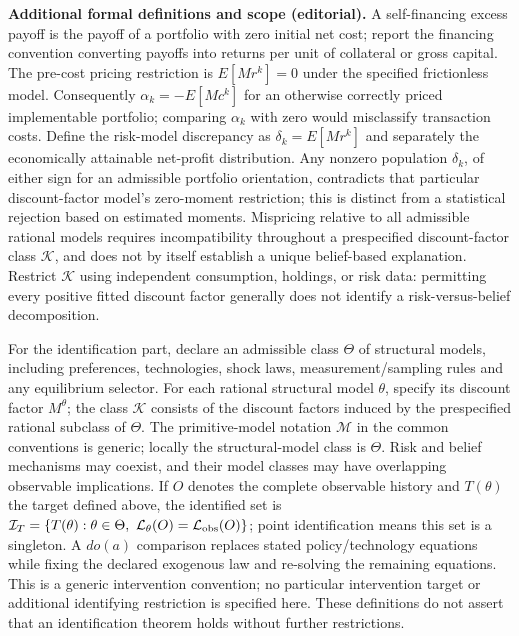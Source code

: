 \documentclass[11pt,a4paper]{article}
\begin{document}
\textbf{Additional formal definitions and scope (editorial).} A self-financing excess payoff is the payoff of a portfolio with zero initial net cost; report the financing convention converting payoffs into returns per unit of collateral or gross capital. The pre-cost pricing restriction is \(E[M r^k]=0\) under the specified frictionless model. Consequently \(\alpha_k=-E[M c^k]\) for an otherwise correctly priced implementable portfolio; comparing \(\alpha_k\) with zero would misclassify transaction costs. Define the risk-model discrepancy as \(\delta_k=E[M r^k]\) and separately the economically attainable net-profit distribution. Any nonzero population \(\delta_k\), of either sign for an admissible portfolio orientation, contradicts that particular discount-factor model's zero-moment restriction; this is distinct from a statistical rejection based on estimated moments. Mispricing relative to all admissible rational models requires incompatibility throughout a prespecified discount-factor class \(\mathcal K\), and does not by itself establish a unique belief-based explanation. Restrict \(\mathcal K\) using independent consumption, holdings, or risk data: permitting every positive fitted discount factor generally does not identify a risk-versus-belief decomposition.

For the identification part, declare an admissible class \(\Theta\) of structural models, including preferences, technologies, shock laws, measurement/sampling rules and any equilibrium selector. For each rational structural model \(\theta\), specify its discount factor \(M^\theta\); the class \(\mathcal K\) consists of the discount factors induced by the prespecified rational subclass of \(\Theta\). The primitive-model notation \(\mathcal M\) in the common conventions is generic; locally the structural-model class is \(\Theta\). Risk and belief mechanisms may coexist, and their model classes may have overlapping observable implications. If \(O\) denotes the complete observable history and \(T(\theta)\) the target defined above, the identified set is \(\mathcal I_T=\{T(\theta):\theta\in\Theta,\ \mathcal L_\theta(O)=\mathcal L_{\rm obs}(O)\}\); point identification means this set is a singleton. A \(do(a)\) comparison replaces stated policy/technology equations while fixing the declared exogenous law and re-solving the remaining equations. This is a generic intervention convention; no particular intervention target or additional identifying restriction is specified here. These definitions do not assert that an identification theorem holds without further restrictions.
\end{document}
